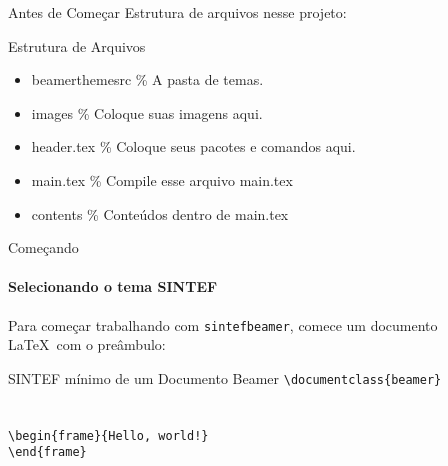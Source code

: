 \begin{frame}{Antes de Começar}
Estrutura de arquivos nesse projeto:
\begin{block}{Estrutura de Arquivos}
    \begin{itemize}
        \item beamerthemesrc \hspace{2pt} \% A pasta de temas.
        \item images \hspace{2pt} \% Coloque suas imagens aqui.
        \item header.tex \hspace{2pt} \% Coloque seus pacotes e comandos aqui.
        \item main.tex \hspace{2pt} \% Compile esse arquivo main.tex
        \item contents \hspace{2pt} \% Conteúdos dentro de main.tex
    \end{itemize}
\end{block}
\end{frame}

\begin{frame}[fragile]{Começando}
\framesubtitle{Selecionando o tema SINTEF}
Para começar trabalhando com \texttt{sintefbeamer}, comece um documento \LaTeX\ com o preâmbulo:
\begin{block}{SINTEF mínimo de um Documento Beamer}
\verb|\documentclass{beamer}|\\
\verb||\\
\verb||\\
\verb|\begin{frame}{Hello, world!}|\\
\verb|\end{frame}|\\
\verb||\\
\end{block}
\end{frame}

